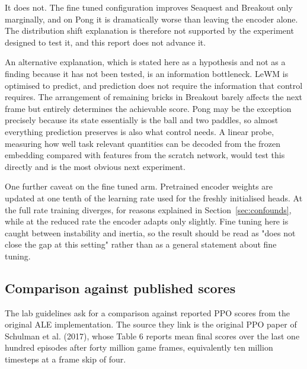 \documentclass[11pt,a4paper]{article}
\begin{document}
It does not. The fine tuned configuration improves Seaquest and Breakout only
marginally, and on Pong it is dramatically worse than leaving the encoder alone.
The distribution shift explanation is therefore not supported by the experiment
designed to test it, and this report does not advance it.

An alternative explanation, which is stated here as a hypothesis and not as a
finding because it has not been tested, is an information bottleneck. LeWM is
optimised to predict, and prediction does not require the information that control
requires. The arrangement of remaining bricks in Breakout barely affects the next
frame but entirely determines the achievable score. Pong may be the exception
precisely because its state essentially is the ball and two paddles, so almost
everything prediction preserves is also what control needs. A linear probe,
measuring how well task relevant quantities can be decoded from the frozen
embedding compared with features from the scratch network, would test this directly
and is the most obvious next experiment.

One further caveat on the fine tuned arm. Pretrained encoder weights are updated at
one tenth of the learning rate used for the freshly initialised heads. At the full
rate training diverges, for reasons explained in Section~\ref{sec:confounds}, while
at the reduced rate the encoder adapts only slightly. Fine tuning here is caught
between instability and inertia, so the result should be read as "does not close
the gap at this setting" rather than as a general statement about fine tuning.

\subsection{Comparison against published scores}

The lab guidelines ask for a comparison against reported PPO scores from the
original ALE implementation. The source they link is the original PPO paper of
Schulman et al. (2017), whose Table 6 reports mean final scores over the last one
hundred episodes after forty million game frames, equivalently ten million
timesteps at a frame skip of four.
\end{document}
